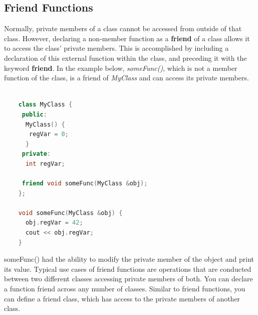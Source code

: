 \documentclass[12pt , a4paper]{article}
\newcommand{\hl}[1]{\colorbox{coolblack}{\color{cream}\textbf{#1}\color{black}}}
\begin{document}
	\subsection{Friend Functions}
Normally, private members of a class cannot be accessed from outside of that class.
However, declaring a non-member function as a \textbf{friend} of a class allows it to access the class' private members. This is accomplished by including a declaration of this external function within the class, and preceding it with the keyword \hl{friend}.
In the example below, \textit{someFunc()}, which is not a member function of the class, is a friend of \textit{MyClass} and can access its private members.
	\begin{lstlisting}[language=C++]

	class MyClass {
	 public:
	  MyClass() {
	   regVar = 0;
	  }
	 private:
	  int regVar;
	    
	 friend void someFunc(MyClass &obj);
	};
	
	void someFunc(MyClass &obj) {
	  obj.regVar = 42;
	  cout << obj.regVar;
	}
	\end{lstlisting}
someFunc() had the ability to modify the private member of the object and print its value.
Typical use cases of friend functions are operations that are conducted between two different classes accessing private members of both.
You can declare a function friend across any number of classes.
Similar to friend functions, you can define a friend class, which has access to the private members of another class.\\

\end{document}
